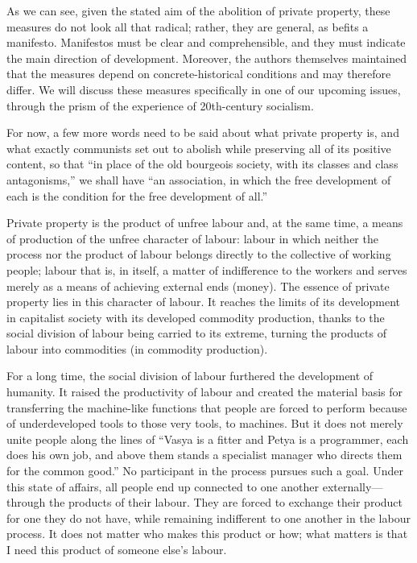 \documentclass[../main]{subfiles}
\begin{document}
As we can see, given the stated aim of the abolition of private property, these measures do not look all that radical; rather, they are general, as befits a manifesto. Manifestos must be clear and comprehensible, and they must indicate the main direction of development. Moreover, the authors themselves maintained that the measures depend on concrete-historical conditions and may therefore differ. We will discuss these measures specifically in one of our upcoming issues, through the prism of the experience of 20th-century socialism.

For now, a few more words need to be said about what private property is, and what exactly communists set out to abolish while preserving all of its positive content, so that “in place of the old bourgeois society, with its classes and class antagonisms,” we shall have “an association, in which the free development of each is the condition for the free development of all.”

Private property is the product of unfree labour and, at the same time, a means of production of the unfree character of labour: labour in which neither the process nor the product of labour belongs directly to the collective of working people; labour that is, in itself, a matter of indifference to the workers and serves merely as a means of achieving external ends (money). The essence of private property lies in this character of labour. It reaches the limits of its development in capitalist society with its developed commodity production, thanks to the social division of labour being carried to its extreme, turning the products of labour into commodities (in commodity production).

For a long time, the social division of labour furthered the development of humanity. It raised the productivity of labour and created the material basis for transferring the machine-like functions that people are forced to perform because of underdeveloped tools to those very tools, to machines. But it does not merely unite people along the lines of “Vasya is a fitter and Petya is a programmer, each does his own job, and above them stands a specialist manager who directs them for the common good.” No participant in the process pursues such a goal. Under this state of affairs, all people end up connected to one another externally—through the products of their labour. They are forced to exchange their product for one they do not have, while remaining indifferent to one another in the labour process. It does not matter who makes this product or how; what matters is that I need this product of someone else’s labour.
\end{document}
